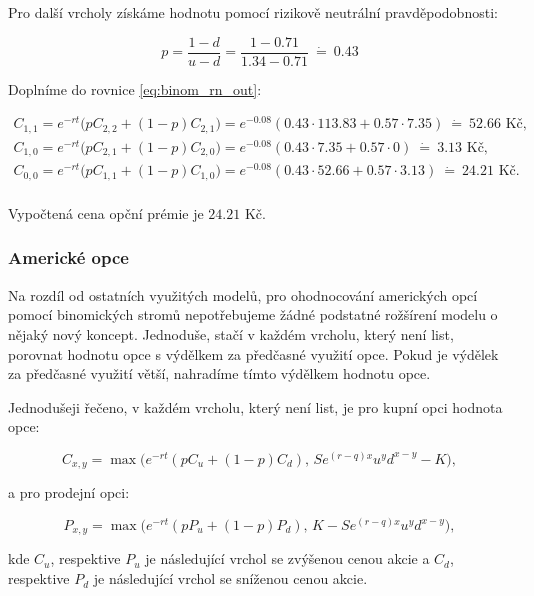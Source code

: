 \documentclass[male,czech,api_bc]{kitheses}
\begin{document}
  Pro další vrcholy získáme hodnotu pomocí rizikově neutrální pravděpodobnosti:

  \begin{equation*}
    p = \frac{1 - d}{u - d} = \frac{1 - 0.71}{1.34 - 0.71} \ \dot{=}\  0.43
  \end{equation*}

  Doplníme do rovnice \eqref{eq:binom_rn_out}:

  \begin{gather*}
    C_{1, 1} = e^{-rt} \bigl(p C_{2, 2} + (1 - p) C_{2, 1} \bigr) = e^{-0.08} (0.43 \cdot 113.83 + 0.57 \cdot 7.35) \ \dot{=}\  52.66 \text{ Kč}, \\
    C_{1, 0} = e^{-rt} \bigl(p C_{2, 1} + (1 - p) C_{2, 0} \bigr) = e^{-0.08} (0.43 \cdot 7.35 + 0.57 \cdot 0) \ \dot{=}\  3.13 \text{ Kč}, \\
    C_{0, 0} = e^{-rt} \bigl(p C_{1, 1} + (1 - p) C_{1, 0} \bigr) = e^{-0.08} (0.43 \cdot 52.66 + 0.57 \cdot 3.13) \ \dot{=}\  24.21 \text{ Kč}. \\
  \end{gather*}

  Vypočtená cena opční prémie je $24.21$ Kč.

 \subsubsection{Americké opce}

 Na rozdíl od ostatních využitých modelů, pro ohodnocování amerických opcí pomocí binomických stromů nepotřebujeme žádné podstatné rožšírení modelu o nějaký nový koncept. Jednoduše, stačí v každém vrcholu, který není list, porovnat hodnotu opce s výdělkem za předčasné využití opce. Pokud je výdělek za předčasné využití větší, nahradíme tímto výdělkem hodnotu opce.

 Jednodušeji řečeno, v každém vrcholu, který není list, je pro kupní opci hodnota opce:

  \begin{equation}
    C_{x, y} = \max\bigl(e^{-rt}(p C_u + (1-p) C_d),\, S e^{(r-q)x} u^y d^{x - y} - K\bigr),
  \end{equation}

  a pro prodejní opci:

  \begin{equation}
    P_{x, y} = \max\bigl(e^{-rt}(p P_u + (1-p) P_d),\, K - S e^{(r-q)x} u^y d^{x - y}\bigr),
  \end{equation}

  kde $C_u$, respektive $P_u$ je následující vrchol se zvýšenou cenou akcie a $C_d$, respektive $P_d$ je následující vrchol se sníženou cenou akcie.
\end{document}
